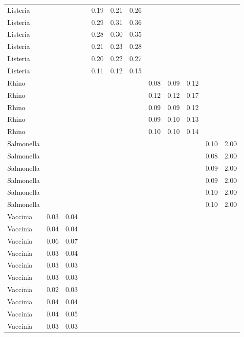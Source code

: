 \begin{tabular}{lrrrrrrrrrrr}
  Listeria &  &  &  & 0.19 & 0.21 & 0.26 &  &  &  &  &  \\ 
  Listeria &  &  &  & 0.29 & 0.31 & 0.36 &  &  &  &  &  \\ 
  Listeria &  &  &  & 0.28 & 0.30 & 0.35 &  &  &  &  &  \\ 
  Listeria &  &  &  & 0.21 & 0.23 & 0.28 &  &  &  &  &  \\ 
  Listeria &  &  &  & 0.20 & 0.22 & 0.27 &  &  &  &  &  \\ 
  Listeria &  &  &  & 0.11 & 0.12 & 0.15 &  &  &  &  &  \\ 
  Rhino &  &  &  &  &  &  & 0.08 & 0.09 & 0.12 &  &  \\ 
  Rhino &  &  &  &  &  &  & 0.12 & 0.12 & 0.17 &  &  \\ 
  Rhino &  &  &  &  &  &  & 0.09 & 0.09 & 0.12 &  &  \\ 
  Rhino &  &  &  &  &  &  & 0.09 & 0.10 & 0.13 &  &  \\ 
  Rhino &  &  &  &  &  &  & 0.10 & 0.10 & 0.14 &  &  \\ 
  Salmonella &  &  &  &  &  &  &  &  &  & 0.10 & 2.00 \\ 
  Salmonella &  &  &  &  &  &  &  &  &  & 0.08 & 2.00 \\ 
  Salmonella &  &  &  &  &  &  &  &  &  & 0.09 & 2.00 \\ 
  Salmonella &  &  &  &  &  &  &  &  &  & 0.09 & 2.00 \\ 
  Salmonella &  &  &  &  &  &  &  &  &  & 0.10 & 2.00 \\ 
  Salmonella &  &  &  &  &  &  &  &  &  & 0.10 & 2.00 \\ 
  Vaccinia & 0.03 & 0.04 &  &  &  &  &  &  &  &  &  \\ 
  Vaccinia & 0.04 & 0.04 &  &  &  &  &  &  &  &  &  \\ 
  Vaccinia & 0.06 & 0.07 &  &  &  &  &  &  &  &  &  \\ 
  Vaccinia & 0.03 & 0.04 &  &  &  &  &  &  &  &  &  \\ 
  Vaccinia & 0.03 & 0.03 &  &  &  &  &  &  &  &  &  \\ 
  Vaccinia & 0.03 & 0.03 &  &  &  &  &  &  &  &  &  \\ 
  Vaccinia & 0.02 & 0.03 &  &  &  &  &  &  &  &  &  \\ 
  Vaccinia & 0.04 & 0.04 &  &  &  &  &  &  &  &  &  \\ 
  Vaccinia & 0.04 & 0.05 &  &  &  &  &  &  &  &  &  \\ 
  Vaccinia & 0.03 & 0.03 &  &  &  &  &  &  &  &  &  \\ 
   \hline
\end{tabular}

